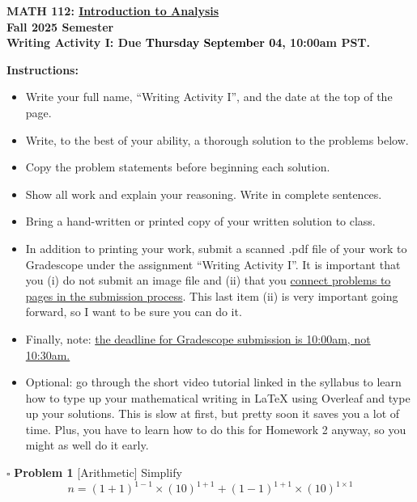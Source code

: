 \documentclass[11pt]{article}
\numberwithin{equation}{section}
\begin{document}
\hypersetup{linkcolor=black}

\begin{center} 
\textbf{{MATH 112: \underline{Introduction to Analysis}}}\\
\textbf{{Fall 2025 Semester}}\\
\textbf{{Writing Activity I: Due \textcolor{black}{Thursday} \textcolor{black}{September} \textcolor{black}{04}, 10:00am PST.}}\\
 \end{center}
 $ \ $\\
 \noindent \textbf{Instructions:}
 \begin{itemize}
 \itemsep0em
 \item Write your full name, ``Writing Activity I'', and the date at the top of the page.
 \item Write, to the best of your ability, a thorough solution to the problems below.
 \item Copy the problem statements before beginning each solution.
 \item Show all work and explain your reasoning.  Write in complete sentences.
 \item Bring a hand-written or printed copy of your written solution to class.
 \item In addition to printing your work, submit a scanned .pdf file of your work to Gradescope under the assignment ``Writing Activity I''.  It is important that you (i) do not submit an image file and (ii) that you \underline{connect problems to pages in the submission process}.  This last item (ii) is very important going forward, so I want to be sure you can do it.
 \item Finally, note: \underline{{the deadline for Gradescope submission is 10:00am, not 10:30am.}}
 \item Optional: go through the short video tutorial linked in the syllabus to learn how to type up your mathematical writing in LaTeX using Overleaf and type up your solutions.  This is slow at first, but pretty soon it saves you a lot of time.  Plus, you have to learn how to do this for Homework 2 anyway, so you might as well do it early.
 \end{itemize}
 
 $ \ $\\

    \noindent $\square$ \textbf{Problem 1} \textsf{[Arithmetic]} Simplify
    \begin{equation} n=(1+1)^{1-1} \times (10)^{1+1} + (1-1)^{1+1} \times (10)^{1 \times 1}  \nonumber \end{equation} 
 
\end{document}
